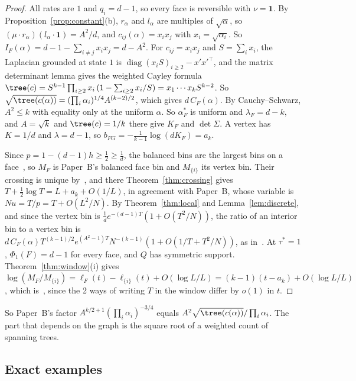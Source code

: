 \begin{proof}
All rates are $1$ and $q_i=d-1$, so every face is reversible with
$\nu=\mathbf 1$. By Proposition~\ref{prop:constant}(b), $r_\alpha$ and
$l_\alpha$ are multiples of $\sqrt\alpha$, so
$(\mu\cdot r_\alpha)(l_\alpha\cdot\mathbf 1)=A^2/d$, and
$c_{ij}(\alpha)=x_ix_j$ with $x_i=\sqrt{\alpha_i}$. So
$I_F(\alpha)=d-1-\sum_{i\ne j}x_ix_j=d-A^2$. For $c_{ij}=x_ix_j$ and
$S=\sum_ix_i$, the Laplacian grounded at state $1$ is
$\operatorname{diag}(x_iS)_{i\ge2}-x'x'^\top$, and the matrix determinant
lemma gives the weighted Cayley formula
$\tree(c)=S^{k-1}\prod_{i\ge2}x_i\,(1-\sum_{i\ge2}x_i/S)=x_1\cdots x_kS^{k-2}$.
So $\sqrt{\tree(c(\alpha))}=(\prod_i\alpha_i)^{1/4}A^{(k-2)/2}$, which gives
$d\,C_F(\alpha)$. By Cauchy--Schwarz, $A^2\le k$ with equality only at the
uniform $\alpha$. So $\alpha^*_F$ is uniform and $\lambda_F=d-k$, and $A=\sqrt k$
and $\tree(c)=1/k$ there give $K_F$ and $\det\Sigma$. A vertex has $K=1/d$ and
$\lambda=d-1$, so $b_{FG}=-\frac1{k-1}\log(dK_F)=a_k$.

Since $p=1-(d-1)h\ge\frac12\ge\frac1d$, the balanced bins are the largest
bins on a face~\cite[Theorem~3.6]{paperB}, so $M_F$ is Paper~B's balanced face
bin and $M_{\{i\}}$ its vertex bin. Their crossing is unique
by~\cite[Theorem~3.1]{paperB}, and there Theorem~\ref{thm:crossing} gives
$T+\frac12\log T=L+a_k+O(1/L)$, in agreement with Paper~B, whose variable is
$Nu=T/p=T+O(L^2/N)$. By Theorem~\ref{thm:local} and
Lemma~\ref{lem:discrete}, and since the vertex bin is
$\frac1de^{-(d-1)T}(1+O(T^2/N))$, the ratio of an interior bin to a vertex
bin is $d\,C_F(\alpha)T^{(k-1)/2}e^{(A^2-1)T}N^{-(k-1)}(1+O(1/T+T^2/N))$, as
in~\cite[Theorem~3.5]{paperB}. At $\tau^*=1$, $\Phi_1(F)=d-1$ for every face,
and $Q$ has symmetric support. Theorem~\ref{thm:window}(i) gives
$\log(M_F/M_{\{i\}})=\ell_F(t)-\ell_{\{i\}}(t)+O(\log L/L)=(k-1)(t-a_k)
+O(\log L/L)$, which is~\cite[Theorem~3.2]{paperB}, since the 2 ways of
writing $T$ in the window differ by $o(1)$ in $t$.
\end{proof}

So Paper~B's factor $A^{k/2+1}(\prod_i\alpha_i)^{-3/4}$ equals
$A^2\sqrt{\tree(c(\alpha))}/\prod_i\alpha_i$. The part that depends on the
graph is the square root of a weighted count of spanning trees.

\subsection{Exact examples}

